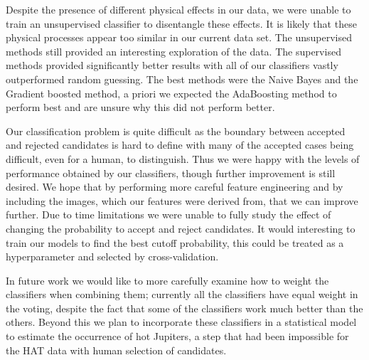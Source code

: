 Despite the presence of different physical effects in our data, we were unable to train an unsupervised classifier to disentangle these effects. It is likely that these physical processes appear too similar in our current data set. The unsupervised methods still provided an interesting exploration of the data. The supervised methods provided significantly better results with all of our classifiers vastly outperformed random guessing. The best methods were the Naive Bayes and the Gradient boosted method, a priori we expected the AdaBoosting method to perform best and are unsure why this did not perform better.

Our classification problem is quite difficult as the boundary between accepted and rejected candidates is hard to define with many of the accepted cases being difficult, even for a human, to distinguish. Thus we were happy with the levels of performance obtained by our classifiers, though further improvement is still desired. We hope that by performing more careful feature engineering and by including the images, which our features were derived from, that we can improve further. Due to time limitations we were unable to fully study the effect of changing the probability to accept and reject candidates. It would interesting to train our models to find the best cutoff probability, this could be treated as a hyperparameter and selected by cross-validation.


In future work we would like to more carefully examine how to weight the classifiers when combining them; currently all the classifiers have equal weight in the voting, despite the fact that some of the classifiers work much better than the others. Beyond this we plan to incorporate these classifiers in a statistical model to estimate the occurrence of hot Jupiters, a step that had been impossible for the HAT data with human selection of candidates.